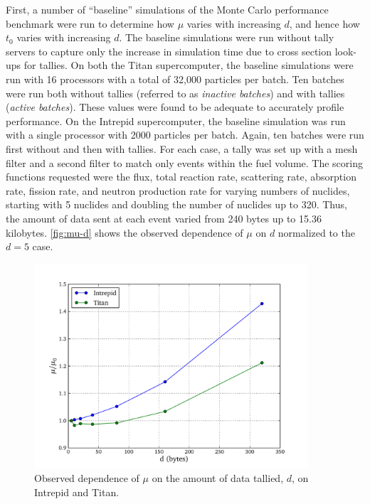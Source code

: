 First, a number of ``baseline'' simulations of the Monte Carlo performance
benchmark were run to determine how $\mu$ varies with increasing $d$, and hence
how $t_0$ varies with increasing $d$. The baseline simulations were run without
tally servers to capture only the increase in simulation time due to cross
section look-ups for tallies. On both the Titan supercomputer, the baseline
simulations were run with 16 processors with a total of 32,000 particles per
batch. Ten batches were run both without tallies (referred to as \emph{inactive
  batches}) and with tallies (\emph{active batches}). These values were found to
be adequate to accurately profile performance. On the Intrepid supercomputer,
the baseline simulation was run with a single processor with 2000 particles per
batch. Again, ten batches were run first without and then with tallies. For each
case, a tally was set up with a mesh filter and a second filter to match only
events within the fuel volume. The scoring functions requested were the flux,
total reaction rate, scattering rate, absorption rate, fission rate, and neutron
production rate for varying numbers of nuclides, starting with 5 nuclides and
doubling the number of nuclides up to 320. Thus, the amount of data sent at each
event varied from 240 bytes up to 15.36 kilobytes. \autoref{fig:mu-d} shows the
observed dependence of $\mu$ on $d$ normalized to the $d=5$ case.

\begin{figure}
  \centering
  \includegraphics[width=4.0in]{figures/ch6/results_baseline.pdf}
  \caption{Observed dependence of $\mu$ on the amount of data tallied, $d$, on
    Intrepid and Titan.}
  \label{fig:mu-d}
\end{figure}

